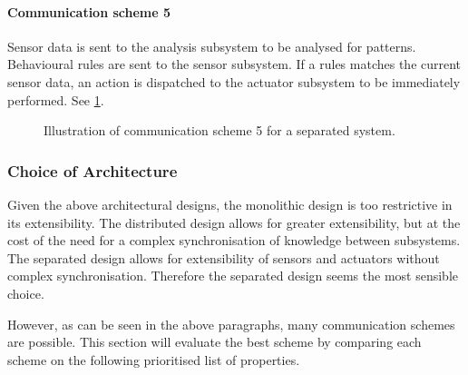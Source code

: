 \paragraph{Communication scheme 5}

Sensor data is sent to the analysis subsystem to be analysed for patterns. Behavioural rules are sent to the sensor subsystem. If a rules matches the current sensor data, an action is dispatched to the actuator subsystem to be immediately performed. See \cref{fig:separated_subsystems_scheme5}.

\begin{figure}[htbp]
\centering
{}
\caption{Illustration of communication scheme 5 for a separated system.}\label{fig:separated_subsystems_scheme5}
\end{figure}

\subsubsection{Choice of Architecture}

Given the above architectural designs, the monolithic design is too restrictive in its extensibility. The distributed design allows for greater extensibility, but at the cost of the need for a complex synchronisation of knowledge between subsystems. The separated design allows for extensibility of sensors and actuators without complex synchronisation. Therefore the separated design seems the most sensible choice.

However, as can be seen in the above paragraphs, many communication schemes are possible. This section will evaluate the best scheme by comparing each scheme on the following prioritised list of properties.


